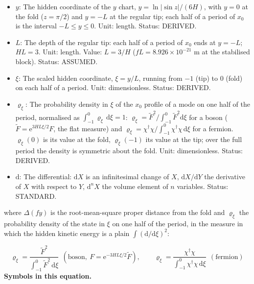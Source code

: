 \documentclass[
  10pt,
]{article}
\begin{document}
\begin{itemize}
  \(-H^2\)). Unit: dimensionless. Status: DERIVED.
\item
  \(y\): The hidden coordinate of the \(y\) chart,
  \(y = \ln\lvert\sin z\rvert/(6H)\), with \(y = 0\) at the fold
  (\(z = \pi/2\)) and \(y = -L\) at the regular tip; each half of a
  period of \(x_0\) is the interval \(-L \le y \le 0\). Unit: length.
  Status: DERIVED.
\item
  \(L\): The depth of the regular tip: each half of a period of \(x_0\)
  ends at \(y = -L\); \(HL = 3\). Unit: length. Value: \(L = 3/H\)
  (\(fL = 8.926\times10^{-21}\) m at the stabilised block). Status:
  ASSUMED.
\item
  \(\xi\): The scaled hidden coordinate, \(\xi = y/L\), running from
  \(-1\) (tip) to \(0\) (fold) on each half of a period. Unit:
  dimensionless. Status: DERIVED.
\item
  \(\varrho_\xi\): The probability density in \(\xi\) of the \(x_0\)
  profile of a mode on one half of the period, normalised as
  \(\int_{-1}^{0}\varrho_\xi\,\mathrm{d}\xi = 1\):
  \(\varrho_\xi = \tilde F^2/\int_{-1}^{0}\tilde F^2\mathrm{d}\xi\) for
  a boson (\(\tilde F = \mathrm{e}^{3HL\xi/2}F\), the flat measure) and
  \(\varrho_\xi = \chi^\dagger\chi/\int_{-1}^{0}\chi^\dagger\chi\,\mathrm{d}\xi\)
  for a fermion. \(\varrho_\xi(0)\) is its value at the fold,
  \(\varrho_\xi(-1)\) its value at the tip; over the full period the
  density is symmetric about the fold. Unit: dimensionless. Status:
  DERIVED.
\item
  \(\mathrm{d}\): The differential: \(\mathrm{d}X\) is an infinitesimal
  change of \(X\), \(\mathrm{d}X/\mathrm{d}Y\) the derivative of \(X\)
  with respect to \(Y\), \(\mathrm{d}^nX\) the volume element of \(n\)
  variables. Status: STANDARD.
\end{itemize}

where \(\Delta(fy)\) is the root-mean-square proper distance from the
fold and \(\varrho_\xi\) the probability density of the state in \(\xi\)
on one half of the period, in the measure in which the hidden kinetic
energy is a plain \(\int(\mathrm{d}/\mathrm{d}\xi)^2\):

\[ \varrho_\xi = \frac{\tilde F^2}{\int_{-1}^{0}\tilde F^2\,\mathrm{d}\xi}\ \ (\text{boson},\ F = \mathrm{e}^{-3HL\xi/2}\tilde F),\qquad \varrho_\xi = \frac{\chi^\dagger\chi}{\int_{-1}^{0}\chi^\dagger\chi\,\mathrm{d}\xi}\ \ (\text{fermion}) \]
\textbf{Symbols in this equation.}
\end{document}
